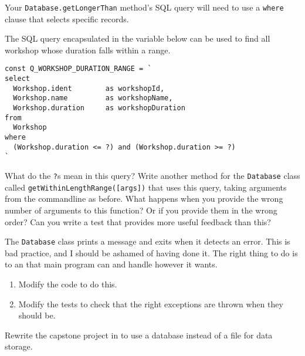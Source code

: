 Your \texttt{Database.getLongerThan} method's SQL query
will need to use a \texttt{where} clause
that selects specific records.


The SQL query encapsulated in the variable below can be used to
find all workshop whose duration falls within a range.

\begin{verbatim}
const Q_WORKSHOP_DURATION_RANGE = `
select
  Workshop.ident        as workshopId,
  Workshop.name         as workshopName,
  Workshop.duration     as workshopDuration
from
  Workshop
where
  (Workshop.duration <= ?) and (Workshop.duration >= ?)
`
\end{verbatim}

What do the \texttt{?}s mean in this query?
Write another method for the \texttt{Database} class called \texttt{getWithinLengthRange({[}args{]})}
that uses this query, taking arguments from the commandline as before.
What happens when you provide the wrong number of arguments to this function? Or
if you provide them in the wrong order?
Can you write a test that provides more useful feedback than this?


The \texttt{Database} class prints a message and exits when it detects an error.
This is bad practice,
and I should be ashamed of having done it.
The right thing to do is to 
an 
that main program can 
and handle however it wants.

\begin{enumerate}
\item
  Modify the code to do this.
\item
  Modify the tests to check that the right exceptions are thrown when they should be.
\end{enumerate}


Rewrite the capstone project in  to use a database instead of a file for data storage.
